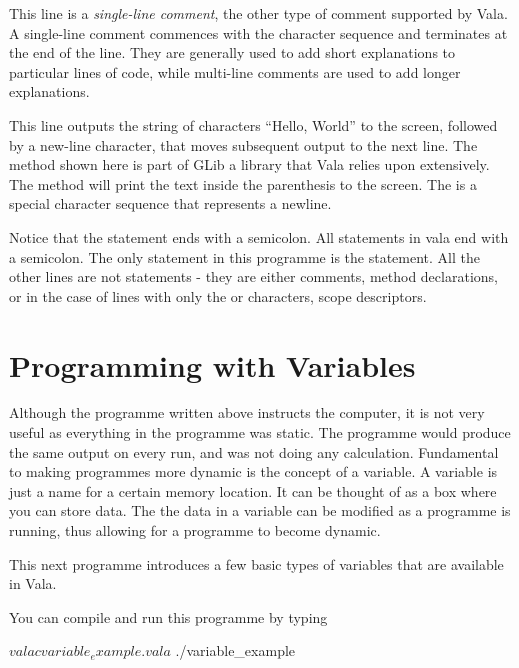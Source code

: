 This line is a \emph{single-line comment}, the other type of comment supported by Vala. A single-line comment commences with the character sequence \inlinecode{//} and terminates at the end of the line. They are generally used to add short explanations to particular lines of code, while multi-line  comments are used to add longer explanations.


This line outputs the string of characters “Hello, World” to the screen, followed by a new-line character, that moves subsequent output to the next line. The  method shown here is part of GLib a library that Vala relies upon extensively. The  method will print the text inside the parenthesis to the screen. The  is a special character sequence that represents a newline.

Notice that the  statement ends with a semicolon. All statements in vala end with a semicolon. The only statement in this programme is the  statement. All the other lines are not statements - they are either comments, method declarations, or in the case of lines with only the \inlinecode{\{} or \inlinecode{\}} characters, scope descriptors.

\section{Programming with Variables}

Although the programme written above instructs the computer, it is not very useful as everything in the programme was static. The programme would produce the same output on every run, and was not doing any calculation. Fundamental to making programmes more dynamic is the concept of a variable. A variable is just a name for a certain memory location. It can be thought of as a box where you can store data. The the data in a variable can be modified as a programme is running, thus allowing for a programme to become dynamic.

This next programme introduces a few basic types of variables that are available in Vala.


You can compile and run this programme by typing

\begin{bashcommands}
$ valac variable_example.vala
$ ./variable_example
\end{bashcommands}

